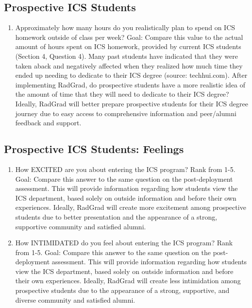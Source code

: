 \subsection{Prospective ICS Students}
\begin{enumerate}
\item Approximately how many hours do you realistically plan to spend on ICS homework outside of class per week?
Goal: Compare this value to the actual amount of hours spent on ICS homework, provided by current ICS students (Section 4, Question 4). Many past students have indicated that they were taken aback and negatively affected when they realized how much time they ended up needing to dedicate to their ICS degree (source: techhui.com). After implementing RadGrad, do prospective students have a more realistic idea of the amount of time that they will need to dedicate to their ICS degree? Ideally, RadGrad will better prepare prospective students for their ICS degree journey due to easy access to comprehensive information and peer/alumni feedback and support.
\end{enumerate}

\subsection{Prospective ICS Students: Feelings}
\begin{enumerate}
\item How EXCITED are you about entering the ICS program? Rank from 1-5.
Goal: Compare this answer to the same question on the post-deployment assessment.  This will provide information regarding how students view the ICS department, based solely on outside information and before their own experiences. Ideally, RadGrad will create more excitement among prospective students due to better presentation and the appearance of a strong, supportive community and satisfied alumni.
\item How INTIMIDATED do you feel about entering the ICS program? Rank from 1-5.
Goal: Compare this answer to the same question on the post-deployment assessment.  This will provide information regarding how students view the ICS department, based solely on outside information and before their own experiences. Ideally, RadGrad will create less intimidation among prospective students due to the appearance of a strong, supportive, and diverse community and satisfied alumni. 
\end{enumerate}

